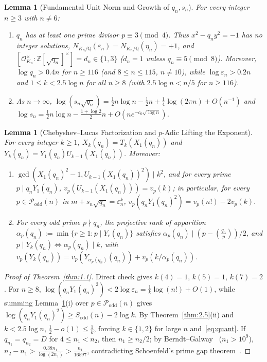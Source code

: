 \documentclass[11pt,reqno]{amsart}
\newtheorem{lemma}[theorem]{Lemma}
\theoremstyle{remark}
\newcommand{\Z}{\mathbb{Z}}
\newcommand{\Q}{\mathbb{Q}}
\newcommand{\Podd}{\mathcal{P}_{\mathrm{odd}}}
\begin{document}
\begin{lemma}[Fundamental Unit Norm and Growth of $q_n, s_n$]\label{lem:3.1}
For every integer $n \ge 3$ with $n \ne 6$:
\begin{enumerate}
\item[(i)] $q_n$ has at least one prime divisor $p \equiv 3 \pmod 4$. Thus $x^2 - q_n y^2 = -1$ has no integer solutions, $N_{K_n/\Q}(\varepsilon_n) = N_{K_n/\Q}(\eta_n) = +1$, and $[\mathcal{O}_{K_n}^\times : \Z[\sqrt{q_n}]^\times] = d_n \in \{1, 3\}$ ($d_n = 1$ unless $q_n \equiv 5 \pmod 8$). Moreover, $\log q_n > 0.4n$ for $n \ge 116$ (and $8 \le n \le 115$, $n \ne 10$), while $\log \varepsilon_n > 0.2n$ and $1 \le k < 2.5\log n$ for all $n \ge 8$ (with $2.5\log n < n/5$ for $n \ge 116$).
\item[(ii)] As $n \to \infty$, $\log(s_n\sqrt{q_n}) = \frac{1}{2}n\log n - \frac{1}{2}n + \frac{1}{4}\log(2\pi n) + O(n^{-1})$ and $\log s_n = \frac{1}{2}n\log n - \frac{1+\log 2}{2}n + O(n e^{-c_0\sqrt{\log n}})$.
\end{enumerate}
\end{lemma}

\begin{lemma}[Chebyshev--Lucas Factorization and $p$-Adic Lifting the Exponent]\label{lem:3.2}
For every integer $k \ge 1$, $X_k(q_n) = T_k(X_1(q_n))$ and $Y_k(q_n) = Y_1(q_n) U_{k-1}(X_1(q_n))$. Moreover:
\begin{enumerate}
\item[(i)] $\gcd(X_1(q_n)^2 - 1, U_{k-1}(X_1(q_n))^2) \mid k^2$, and for every prime $p \mid q_n Y_1(q_n)$, $v_p(U_{k-1}(X_1(q_n))) = v_p(k)$; in particular, for every $p \in \Podd(n)$ in $m + s_n\sqrt{q_n} = \varepsilon_n^k$, $v_p(q_n Y_1(q_n)^2) = v_p(n!) - 2v_p(k)$.
\item[(ii)] For every odd prime $p \nmid q_n$, the projective rank of apparition $\alpha_p(q_n) := \min\{r \ge 1 : p \mid Y_r(q_n)\}$ satisfies $\alpha_p(q_n) \mid (p - (\frac{q_n}{p}))/2$, and $p \mid Y_k(q_n) \iff \alpha_p(q_n) \mid k$, with $v_p(Y_k(q_n)) = v_p(Y_{\alpha_p(q_n)}(q_n)) + v_p(k/\alpha_p(q_n))$.
\end{enumerate}
\end{lemma}

\begin{proof}[Proof of Theorem~\ref{thm:1.1}]
Direct check gives $k(4)=1$, $k(5)=1$, $k(7)=2$. For $n \ge 8$, $\log(q_n Y_1(q_n)^2) < 2\log\varepsilon_n = \frac{1}{k}\log(n!) + O(1)$, while summing Lemma~\ref{lem:3.2}(i) over $p \in \Podd(n)$ gives $\log(q_n Y_1(q_n)^2) \ge S_{\mathrm{odd}}(n) - 2\log k$. By Theorem~\ref{thm:2.5}(ii) and $k < 2.5\log n$, $\frac{1}{2} - o(1) \le \frac{1}{k}$, forcing $k \in \{1, 2\}$ for large $n$ and~\eqref{eq:quant}. If $q_{n_1} = q_{n_2} = D$ for $4 \le n_1 < n_2$, then $n_1 \ge n_2/2$; by Berndt--Galway~\cite{BerndtGalway2000} ($n_1 > 10^9$), $n_2 - n_1 > \frac{0.38 n_1}{\log(2n_1)} > \frac{n_1}{16597}$, contradicting Schoenfeld's prime gap theorem~\cite{Schoenfeld1976}.
\end{proof}
\end{document}
